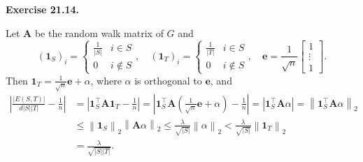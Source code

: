 \documentclass[a4paper]{article}
\newenvironment{exercise}[1]{
	\par
	\noindent\textbf{Exercise #1.}\quad
}{
	\par
	\bigskip
}
\newcommand{\abs}[1]{\left| #1 \right|}
\newcommand{\vabs}[1]{\left\| #1 \right\|}
\newcommand{\pbra}[1]{\left( #1 \right)}
\begin{document}
    \begin{exercise}{21.14}
        Let $\bm A$ be the random walk matrix of $G$ and
        $$
        (\bm 1_S)_i=\begin{cases}
            \frac1{|S|} & i\in S\\
            0 & i\notin S
        \end{cases},\quad
        (\bm 1_T)_i=\begin{cases}
            \frac1{|T|} & i\in S\\
            0 & i\notin S
        \end{cases},\quad
        \bm e=\frac1{\sqrt n}\begin{bmatrix}1\\\vdots\\1\end{bmatrix}.
        $$
        Then $\bm 1_T=\frac1{\sqrt n}\bm e+\alpha$, where $\alpha$ is orthogonal to $\bm e$, and 
        \begin{align*}
            \abs{\frac{|E(S,T)|}{d|S||T|}-\frac1n}
            &=\abs{\bm 1_S^\top\bm A\bm 1_T-\frac1n}
            =\abs{\bm 1_S^\top\bm A\pbra{\frac1{\sqrt n}\bm e+\alpha}-\frac1n}
            =\abs{\bm 1_S^\top\bm A\alpha}
            =\vabs{\bm 1_S^\top\bm A\alpha}_2\\
            &\leq\vabs{\bm1_S}_2\vabs{\bm A\alpha}_2
            \leq\frac\lambda{\sqrt{|S|}}\vabs{\alpha}_2
            <\frac\lambda{\sqrt{|S|}}\vabs{\bm1_T}_2\\
            &=\frac\lambda{\sqrt{|S||T|}}.
        \end{align*}
    \end{exercise}
\end{document}
